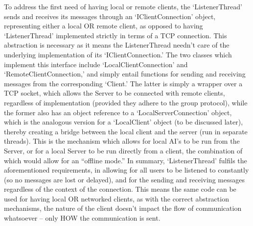 \documentclass[a4paper,doc,draftfirst]{apa6}
\begin{document}
To address the first need of having local or remote clients, the ‘ListenerThread’ sends and receives its messages through an ‘IClientConnection’ object, representing either a local OR remote client, as opposed to having ‘ListenerThread’ implemented strictly in terms of a TCP connection. This abstraction is necessary as it means the ListenerThread needn’t care of the underlying implementation of its ‘IClientConnection.’ The two classes which implement this interface include ‘LocalClientConnection’ and ‘RemoteClientConnection,’ and simply entail functions for sending and receiving messages from the corresponding ‘Client.’ The latter is simply a wrapper over a TCP socket, which allows the Server to be connected with remote clients, regardless of implementation (provided they adhere to the group protocol), while the former also has an object reference to a ‘LocalServerConnection’ object, which is the analogous version for a ‘LocalClient’ object (to be discussed later), thereby creating a bridge between the local client and the server (run in separate threads). This is the mechanism which allows for local AI’s to be run from the Server, or for a local Server to be run directly from a client, the combination of which would allow for an “offline mode.” In summary, ‘ListenerThread’ fulfils the aforementioned requirements, in allowing for all users to be listened to constantly (so no messages are lost or delayed), and for the sending and receiving messages regardless of the context of the connection. This means the same code can be used for having local OR networked clients, as with the correct abstraction mechanisms, the nature of the client doesn’t impact the flow of communication whatsoever -- only HOW the communication is sent.
\end{document}
